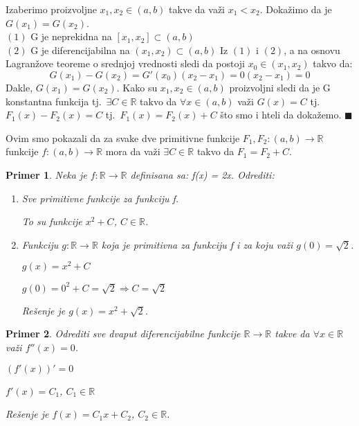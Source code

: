 \documentclass{article}
\newtheorem{prim}{Primer}[section]
\begin{document}
Izaberimo proizvoljne $x_1, x_2 \in (a, b)$ takve da važi
$x_1 < x_2$. Dokažimo da je $G(x_1) = G(x_2)$.\\
$(1)$ G je neprekidna na $[x_1, x_2] \subset (a, b)$\\
$(2)$ G je diferencijabilna na $(x_1, x_2) \subset (a, b)$
Iz $(1)$ i $(2)$, a na osnovu Lagranžove teoreme o srednjoj vrednosti
sledi da postoji $x_0 \in (x_1, x_2)$ takvo da:
$$G(x_1) - G(x_2) = G'(x_0)(x_2-x_1) = 0  (x_2-x_1) = 0$$
Dakle, $G(x_1) = G(x_2)$. Kako su $x_1, x_2 \in (a, b)$
proizvoljni sledi da je G konstantna funkcija tj.\
$\exists C\in\mathbb{R}$ takvo da  $\forall x \in (a, b)$ važi
$G(x) = C$ tj.\ $F_1(x) - F_2(x) = C$ tj.\ $F_1(x) = F_2(x) + C$
što smo i hteli da dokažemo.
\null\hfill $\blacksquare$ \par
Ovim smo pokazali da za svake dve primitivne funkcije
$F_1, F_2: (a,b) \longrightarrow \mathbb{R}$ funkcije
$f: (a,b) \longrightarrow \mathbb{R}$ mora da važi
$\exists C \in \mathbb{R}$ takvo da $F_1=F_2+C$.

\begin{primbox}
    \begin{prim}
        Neka je $f: \mathbb{R} \longrightarrow \mathbb{R}$
        definisana sa: f(x) = 2x. Odrediti:
        \begin{enumerate}
            \item[a)] Sve primitivne funkcije za funkciju f.\par
                  To su funkcije $x^2 + C$, $ C \in \mathbb{R}$.
            \item[b)] Funkciju $g: \mathbb{R} \longrightarrow \mathbb{R}$
                  koja je primitivna za funkciju f i za koju važi
                  $g(0) = \sqrt{2}$.\par
                  $g(x) = x^2 + C$\par$g(0) = 0^2 + C = \sqrt{2} \Rightarrow C = \sqrt{2}$\par
                  Rešenje je $g(x) = x^2 + \sqrt{2}$.
        \end{enumerate}
    \end{prim}
\end{primbox}


\begin{primbox}
    \begin{prim}
        Odrediti sve dvaput diferencijabilne funkcije
        $\mathbb{R} \longrightarrow \mathbb{R}$ takve da
        $\forall x \in \mathbb{R}$ važi $f''(x) = 0$.\par
        $(f'(x))' = 0$\par
        $f'(x) = C_1$, $ C_1 \in \mathbb{R}$ \par
        Rešenje je $f(x) = C_1x + C_2$, $ C_2 \in \mathbb{R}$.

    \end{prim}
\end{primbox}
\end{document}
